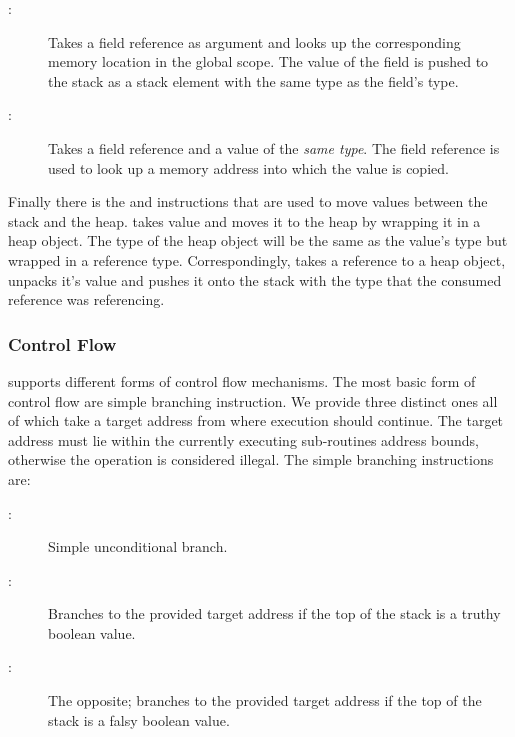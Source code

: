 \begin{description}

\item[:]

  Takes a field reference as argument and looks up the corresponding memory
  location in the global scope. The value of the field is pushed to the stack as
  a stack element with the same type as the field's type.

\item[:]

  Takes a field reference and a value of the \emph{same type}. The field
  reference is used to look up a memory address into which the value is copied.

\end{description}

Finally there is the  and  instructions that are used to
move values between the stack and the heap.  takes value and moves it
to the heap by wrapping it in a heap object. The type of the heap object will be
the same as the value's type but wrapped in a reference type. Correspondingly,
 takes a reference to a heap object, unpacks it's value and pushes
it onto the stack with the type that the consumed reference was referencing.

\subsubsection{Control Flow}
\label{sec:design:isa:control-flow}

\thename{} supports different forms of control flow mechanisms. The most basic
form of control flow are simple branching instruction. We provide three distinct
ones all of which take a target address from where execution should
continue. The target address must lie within the currently executing
sub-routines address bounds, otherwise the operation is considered
illegal. The simple branching instructions are:

\begin{description}

\item[:]

  Simple unconditional branch.

\item[:]

  Branches to the provided target address if the top of the stack is a truthy boolean value.

\item[:]

  The opposite; branches to the provided target address if the top of the stack
  is a falsy boolean value.

\end{description}

